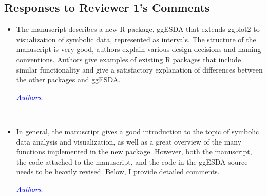 \documentclass[11pt]{article}
\newcommand{\authors}[1]{

 \parbox{15cm}{\textcolor{blue}{\it Authors}: \color{red}#1}
 \\ \vspace{0.3cm}
}
\begin{document}
\subsection*{Responses to Reviewer 1's Comments}
\vspace{0.5cm}


\begin{itemize}
\item
The manuscript describes a new R package, {ggESDA} that extends {ggplot2} to visualization of symbolic data, represented as intervals. The structure of the manuscript is very good, authors explain various design decisions and naming conventions. Authors give examples of existing R packages that include similar functionality and give a satisfactory explanation of differences between the other packages and {ggESDA}.
\authors{

}


\item
In general, the manuscript gives a good introduction to the topic of symbolic data analysis and visualization, as well as a great overview of the many functions implemented in the new package. However, both the manuscript, the code attached to the manuscript, and the code in the {ggESDA} source needs to be heavily revised. Below, I provide detailed comments.
\authors{

}
\end{itemize}



\end{document}
